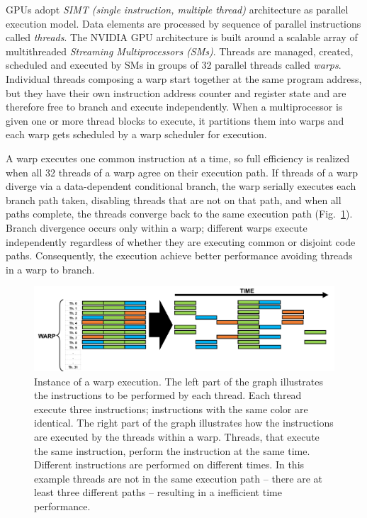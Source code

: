 GPUs adopt \textit{SIMT (single instruction, multiple thread)} architecture as parallel execution model. Data elements are processed by sequence of parallel instructions called \textit{threads}. The NVIDIA GPU architecture is built around a scalable array of multithreaded \textit{Streaming Multiprocessors (SMs)}. Threads are managed, created, scheduled and executed by SMs in groups of 32 parallel threads called \textit{warps}. Individual threads composing a warp start together at the same program address, but they have their own instruction address counter and register state and are therefore free to branch and execute independently. When a multiprocessor is given one or more thread blocks to execute, it partitions them into warps and each warp gets scheduled by a warp scheduler for execution. 

A warp executes one common instruction at a time, so full efficiency is realized when all 32 threads of a warp agree on their execution path. If threads of a warp diverge via a data-dependent conditional branch, the warp serially executes each branch path taken, disabling threads that are not on that path, and when all paths complete, the threads converge back to the same execution path (Fig.~\ref{fig:warp-instruction}). Branch divergence occurs only within a warp; different warps execute independently regardless of whether they are executing common or disjoint code paths. Consequently, the execution achieve better performance avoiding threads in a warp to branch.
\begin{figure}
   \centering
   \includegraphics[width=14cm]{Figs/Warp_instruction.png}
   \caption{Instance of a warp execution. The left part of the graph illustrates the instructions to be performed by each thread. Each thread execute three instructions; instructions with the same color are identical. The right part of the graph illustrates how the instructions are executed by the threads within a warp. Threads, that execute the same instruction, perform the instruction at the same time. Different instructions are performed on different times. In this example threads are not in the same execution path -- there are at least three different paths -- resulting in a inefficient time performance.} \label{fig:warp-instruction}
\end{figure}

